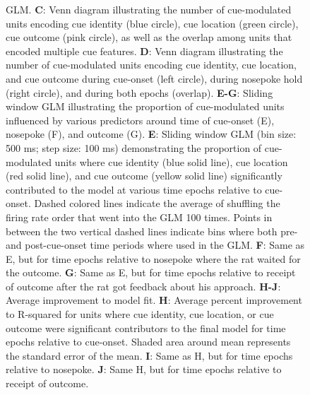 \documentclass[11pt]{article}
\newcommand{\bsf}[1]{\textbf{#1}}
\begin{document}
\begin{figure}[ht!]
{GLM. \bsf{C}: Venn diagram illustrating the number of cue-modulated units encoding cue identity (blue circle), cue location (green circle), cue outcome (pink circle), as well as the overlap among units that encoded multiple cue features. \bsf{D}: Venn diagram illustrating the number of cue-modulated units encoding cue identity, cue location, and cue outcome during cue-onset (left circle), during nosepoke hold (right circle), and during both epochs (overlap). \bsf{E-G}: Sliding window GLM illustrating the proportion of cue-modulated units influenced by various predictors around time of cue-onset (E), nosepoke (F), and outcome (G). \bsf{E}: Sliding window GLM (bin size: 500 ms; step size: 100 ms) demonstrating the proportion of cue-modulated units where cue identity (blue solid line), cue location (red solid line), and cue outcome (yellow solid line) significantly contributed to the model at various time epochs relative to cue-onset. Dashed colored lines indicate the average of shuffling the firing rate order that went into the GLM 100 times. Points in between the two vertical dashed lines indicate bins where both pre- and post-cue-onset time periods where used in the GLM. \bsf{F}: Same as E, but for time epochs relative to nosepoke where the rat waited for the outcome. \bsf{G}: Same as E, but for time epochs relative to receipt of outcome after the rat got feedback about his approach. \bsf{H-J}: Average improvement to model fit. \bsf{H}: Average percent improvement to R-squared for units where cue identity, cue location, or cue outcome were significant contributors to the final model for time epochs relative to cue-onset. Shaded area around mean represents the standard error of the mean. \bsf{I}: Same as H, but for time epochs relative to nosepoke. \bsf{J}: Same H, but for time epochs relative to receipt of outcome.}
\label{fig:NP_GLM}
\end{figure} \clearpage
\end{document}
